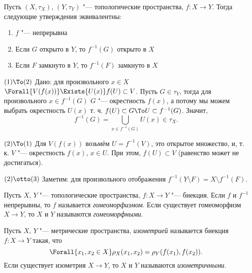 \documentclass[main]{subfiles}
\begin{document}
\begin{theorem}
  Пусть \( (X, \tau_X) \), \( (Y, \tau_Y) \) "--- топологические пространства,
  \( f : X \to Y \). Тогда следующие утверждения
  эквивалентны:
  \begin{enumerate}
    \item \( f \) "--- непрерывна
    \item Если \( G \) открыто в \( Y \), то
      \( f^{-1}(G) \) открыто в \( X \)
    \item Если \( F \) замкнуто в \( Y \), то
      \( f^{-1}(F) \) замкнуто в \( X \)
  \end{enumerate}
\end{theorem}
\begin{itemproof}
  \item[\( (1) \To (2) \)] Дано: для произвольного \( x \in X \)
    \( \Forall{V(f(x))} \Exists{U(x)} f(U) \subset V \).
    Пусть  \( G \in \tau_Y \), тогда для произвольного \( x \in f^{-1}(G) \)
    \( G \) "--- окрестность \( f(x) \), а потому
    мы можем выбрать окрестность \( U(x) \) т. ч. \( f(U) \subset G \To
    U \subset f^{-1}(G) \). Значит,
    \[
      f^{-1}(G) = \bigcup_{x \in f^{-1}(G)} U(x) \in \tau_X.
    \]

  \item[\( (2) \To (1) \)]
    Для \( V(f(x)) \) возьмём \( U = f^{-1}(V) \),
    это открытое множество, и, т. к. \( V \) "--- окрестность \( f(x) \),
    \( x \in U \). При этом, \( f(U) \subset V \) 
    (равенство может не достигаться).

  \item[\( (2) \otto (3) \)]
    Заметим: для произвольного отображения
    \( f^{-1}(Y \setminus F) = X \setminus f^{-1}(F) \).
\end{itemproof}

\begin{definition}
  Пусть \( X \), \( Y \) "--- топологические пространства,
  \( f : X \to Y \) "--- биекция. Если \( f \) и \( f^{-1} \)
  непрерывны, то \( f \) называется \emph{гомеоморфизмом}.
  Если существует гомеоморфизм \( X \to Y \), то
  \( X \) и \( Y \) называются \emph{гомеоморфными}.
\end{definition}

\begin{definition}
  Пусть \( X \), \( Y \) "--- метрические пространства,
  \emph{изометрией} называется биекция \( f : X \to Y \) такая,
  что
  \[
    \Forall{x_1, x_2 \in X} \rho_X(x_1, x_2) = \rho_Y(f(x_1), f(x_2)).
  \]
  Если существует изометрия \( X \to Y \), то
  \( X \) и \( Y \) называются \emph{изометричными}.
\end{definition}
\end{document}
